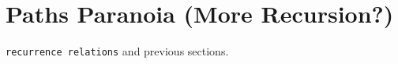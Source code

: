 \documentclass[../../Problems]{subfiles}
\begin{document}
\section{Paths Paranoia (More Recursion?)}{\label{sec:paths}}
\begin{topics}
\verb!recurrence relations! and previous sections.
\end{topics}	






\end{document}
